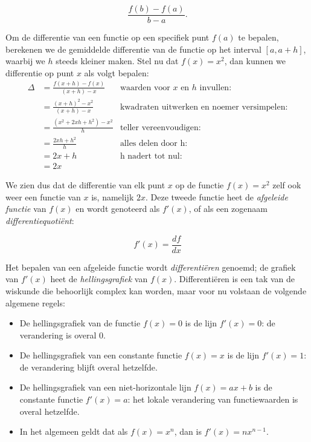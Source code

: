 \[
    \frac{f(b)-f(a)}{b-a}.
\]


Om de differentie van een functie op een specifiek punt $f(a)$ te bepalen, berekenen we de gemiddelde differentie van de functie op het interval $\left[a,a+h\right]$, waarbij we $h$ steeds kleiner maken. Stel nu dat $f(x)=x^2$, dan kunnen we differentie op punt $x$ als volgt bepalen:
\[
\begin{aligned}
    \Delta &= \frac{f(x+h)-f(x)}{(x+h) - x} & \text{waarden voor } x \text{ en } h \text{ invullen:}\\
    &= \frac{(x+h)^2 - x^2}{(x+h)-x} & \text{kwadraten uitwerken en noemer versimpelen:} \\
    &= \frac{(x^2 + 2xh + h^2)-x^2}{h} & \text {teller vereenvoudigen:} \\
    &= \frac{2xh + h^2}{h} & \text{alles delen door h:} \\
    &= 2x + h & \text{h nadert tot nul:} \\
    &= 2x
\end{aligned}
\]            

We zien dus dat de differentie van elk punt $x$ op de functie $f(x) = x^2$ zelf ook weer een functie van $x$ is, namelijk $2x$. 
Deze tweede functie heet de \textit{afgeleide functie} van $f(x)$ en wordt genoteerd als $f'(x)$, of als een zogenaam \textit{differentiequotiënt}:

\[
    f'(x) = \frac{df}{dx}
\]

Het bepalen van een afgeleide functie wordt \textit{differentiëren} genoemd; de grafiek van $f'(x)$ heet de \textit{hellingsgrafiek} van $f(x)$. Differentiëren is een tak van de wiskunde die behoorlijk complex kan worden, maar voor nu volstaan de volgende algemene regels:

\begin{itemize}
    \item De hellingsgrafiek van de functie $f(x)=0$ is de lijn $f'(x)=0$: de verandering is overal 0.
    \item De hellingsgrafiek van een constante functie $f(x)=x$ is de lijn $f'(x)=1$: de verandering blijft overal hetzelfde.
    \item De hellingsgrafiek van een niet-horizontale lijn $f(x) = ax + b$ is de constante functie $f'(x)=a$: het lokale verandering van functiewaarden is overal hetzelfde. 
    \item In het algemeen geldt dat als $f(x) = x^n$, dan is $f'(x) = nx^{n-1}$. 
\end{itemize}


